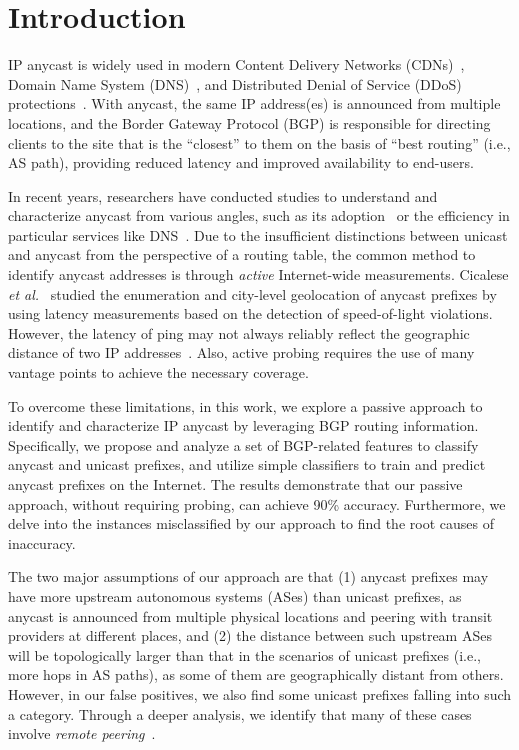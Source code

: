 
\section{Introduction}\label{sec:intro}

IP anycast is widely used in modern Content Delivery Networks (CDNs)~\cite{Calder:2015}, Domain Name
System (DNS)~\cite{fan2013,moura2016anycast},
and Distributed Denial of Service (DDoS) protections~\cite{moura2016anycast}. 
With anycast, the same IP address(es) is announced from multiple locations, and the Border Gateway Protocol (BGP) is responsible for directing clients to the site that is the ``closest'' to them on the basis of ``best routing'' (i.e., AS path), providing reduced latency and improved availability to end-users.

In recent years, researchers have conducted studies to understand and
characterize anycast from various angles, such as its adoption~\cite{cicalese2015characterizing} or the efficiency in particular services like DNS~\cite{li2018internet}.
Due to the insufficient distinctions between unicast and anycast from the perspective of a routing table, the common method to identify anycast addresses is through {\it active} Internet-wide measurements.
Cicalese \emph{et al.}~\cite{cicalese2015characterizing, cicalese2015fistful} studied the enumeration and city-level geolocation of anycast prefixes by using latency measurements based on the detection of speed-of-light violations. 
However, the latency of ping may not always reliably reflect the geographic
distance of two IP addresses~\cite{pam02, Zhang:2005}. Also, active probing requires the use of many vantage points to achieve the necessary coverage.

To overcome these limitations, in this work, we explore a passive approach to
identify and characterize IP anycast by leveraging BGP routing information.
Specifically, we propose and analyze a set of BGP-related features to classify
anycast and unicast prefixes, and utilize simple classifiers to train and
predict anycast prefixes on the Internet. The results demonstrate that our
passive approach, without requiring probing, can achieve 90\% accuracy.
Furthermore, we delve into the instances misclassified by our approach to find the
root causes of inaccuracy.

The two major assumptions of our approach are that (1) anycast prefixes may have more upstream autonomous systems (ASes) than unicast prefixes, as anycast is announced from multiple physical locations and peering with transit providers at different places, and (2) the distance between such upstream ASes will be topologically larger than that in the scenarios of unicast prefixes (i.e., more hops in AS paths), as some of them are geographically distant from others. However, in our false positives, we also find some unicast prefixes falling into such a category. Through a deeper analysis, we identify that many of these cases involve {\it remote peering}~\cite{castro2014remote, Nomikos18}. 
 
